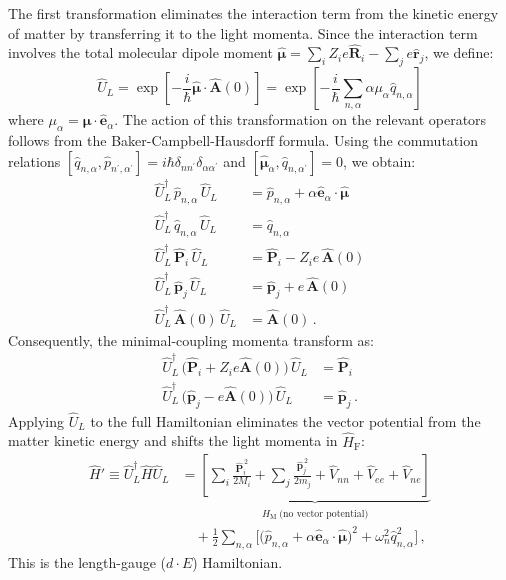 \documentclass[%
 reprint,
 amsmath,amssymb,
 aps,
]{revtex4-2}
\begin{document}
The first transformation eliminates the interaction term from the kinetic energy of matter by transferring it to the light momenta.
Since the interaction term involves the total molecular dipole moment $\hat{\bm \mu} = \sum_i Z_i e \hat{\bm R}_i - \sum_j e \hat{\bm r}_j$, we define:
\begin{equation}
\hat{U}_L = \exp \left[-\frac{i}{\hbar}\hat{\bm \mu} \cdot \hat{\bm A}(0) \right] = \exp \left[-\frac{i}{\hbar} \sum_{n,\alpha} \alpha \mu_\alpha \hat{q}_{n,\alpha} \right] 
\end{equation}
where $\mu_\alpha = \bm\mu \cdot \hat{\bm e}_\alpha$. The action of this transformation on the relevant operators follows from the Baker-Campbell-Hausdorff formula.
Using the commutation relations $[\hat{q}_{n,\alpha},\hat{p}_{n^\prime,\alpha^\prime}]=i\hbar \delta_{nn^\prime} \delta_{\alpha\alpha^\prime}$ and $[\hat{\bm\mu}_\alpha,\hat{q}_{n,\alpha^\prime}]=0$, we obtain:
\begin{align}
\hat{U}_{L}^{\dagger}\, \hat{p}_{n,\alpha}\, \hat{U}_{L} &= \hat{p}_{n,\alpha} + \alpha \hat{\bm e}_{\alpha} \cdot \hat{\bm\mu} \label{eq:p-shift}\\
\hat{U}_{L}^{\dagger}\, \hat{q}_{n,\alpha}\, \hat{U}_{L} &= \hat{q}_{n,\alpha} \\
\hat{U}_{L}^{\dagger}\, \hat{\bm P}_i\, \hat{U}_{L} &= \hat{\bm P}_i - Z_i e\, \hat{\bm A}(0) \\
\hat{U}_{L}^{\dagger}\, \hat{\bm p}_j\, \hat{U}_{L} &= \hat{\bm p}_j + e\, \hat{\bm A}(0) \\
\hat{U}_{L}^{\dagger}\, \hat{\bm A}(0)\, \hat{U}_{L} &= \hat{\bm A}(0) \,.
\end{align}
Consequently, the minimal-coupling momenta transform as:
\begin{align}
\hat{U}_{L}^{\dagger}\, \big(\hat{\bm P}_i + Z_i e \hat{\bm A}(0)\big)\, \hat{U}_{L} &= \hat{\bm P}_i \\
\hat{U}_{L}^{\dagger}\, \big(\hat{\bm p}_j - e \hat{\bm A}(0)\big)\, \hat{U}_{L} &= \hat{\bm p}_j \,.
\end{align}
Applying $\hat{U}_{L}$ to the full Hamiltonian eliminates the vector potential from the matter kinetic energy and shifts the light momenta in $\hat{H}_\mathrm{F}$:
\begin{align}
\hat{H}' \equiv \hat{U}_{L}^{\dagger} \hat{H} \hat{U}_{L}
&= \underbrace{\left[\sum_i \frac{\hat{\bm P}_i^{\,2}}{2M_i} + \sum_j \frac{\hat{\bm p}_j^{\,2}}{2m_j} + \hat{V}_{nn}+\hat{V}_{ee}+\hat{V}_{ne}\right]}_{\displaystyle \hat{H}_\mathrm{M}\ \text{(no vector potential)}} \nonumber\\
&\quad + \frac{1}{2} \sum_{n,\alpha}\bigg[\Big(\hat{p}_{n,\alpha} + \alpha \hat{\bm e}_{\alpha} \cdot \hat{\bm\mu}\Big)^{\!2} + \omega_n^2 \hat{q}_{n,\alpha}^2\bigg] \,,
\label{eq:HL-dE}
\end{align}
This is the length-gauge ($d \cdot E$) Hamiltonian.
\end{document}
